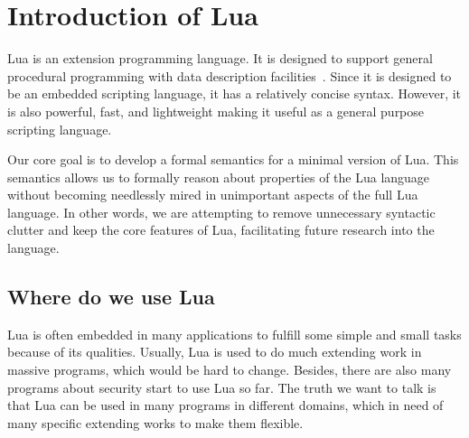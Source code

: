 \chapter{Introduction of Lua}
Lua is an extension programming language. It is designed to support general procedural programming with data description facilities~\cite{aaa}. Since it is designed to be an embedded scripting language, it has a relatively concise syntax. However, it is also powerful, fast, and lightweight making it useful as a general purpose scripting language.



Our core goal is to develop a formal semantics for a minimal version of Lua. This semantics allows us to formally reason about properties of the Lua language without becoming needlessly mired in unimportant aspects of the full Lua language. In other words, we are attempting to remove unnecessary syntactic clutter and keep the core features of Lua, facilitating future research into the language.


\section{Where do we use Lua}


Lua is often embedded in many applications to fulfill some simple and small tasks because of its qualities. Usually, Lua is used to do much extending work in massive programs, which would be hard to change. Besides, there are also many programs about security start to use Lua so far. The truth we want to talk is that Lua can be used in many programs in different domains, which in need of many specific extending works to make them flexible. 

